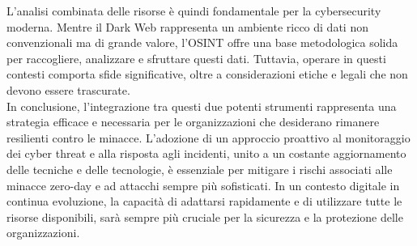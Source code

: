 L'analisi combinata delle risorse è quindi fondamentale per la cybersecurity moderna. Mentre il Dark Web rappresenta un ambiente ricco di dati non convenzionali ma di grande valore, l'OSINT offre una base metodologica solida per raccogliere, analizzare e sfruttare questi dati. Tuttavia, operare in questi contesti comporta sfide significative, oltre a considerazioni etiche e legali che non devono essere trascurate.\\

In conclusione, l'integrazione tra questi due potenti strumenti rappresenta una strategia efficace e necessaria per le organizzazioni che desiderano rimanere resilienti contro le minacce. L'adozione di un approccio proattivo al monitoraggio dei cyber threat e alla risposta agli incidenti, unito a un costante aggiornamento delle tecniche e delle tecnologie, è essenziale per mitigare i rischi associati alle minacce zero-day e ad attacchi sempre più sofisticati. In un contesto digitale in continua evoluzione, la capacità di adattarsi rapidamente e di utilizzare tutte le risorse disponibili, sarà sempre più cruciale per la sicurezza e la protezione delle organizzazioni. 

